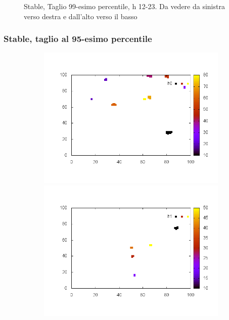 \documentclass[10pt,a4paper]{article}
\begin{document}
\begin{figure}
\begin{subfigure}[b]{1\textwidth}
\end{subfigure}
\caption{Stable, Taglio 99-esimo percentile, h 12-23. Da vedere da sinistra verso destra e dall'alto verso il basso}
\end{figure}


\subsubsection{Stable, taglio al 95-esimo percentile}

\begin{figure}
\centering
\begin{subfigure}[b]{1\textwidth}
\includegraphics[scale=.3]{./img/SCC_Stable3/cut95p/0.png}
\includegraphics[scale=.3]{./img/SCC_Stable3/cut95p/1.png}

\end{subfigure}
\end{figure}
\end{document}
